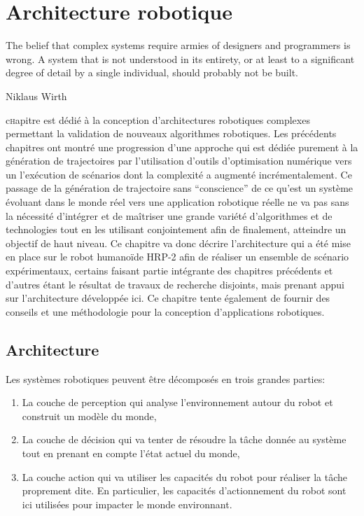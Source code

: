 \chapter{Architecture robotique}
\label{chap:integration}

\epigraph{\foreignlanguage{USenglish}{The belief that complex systems
    require armies of designers and programmers is wrong. A system
    that is not understood in its entirety, or at least to a
    significant degree of detail by a single individual, should
    probably not be built.}}{Niklaus Wirth}
\clearpage

\lettrine[lines=2, lraise=0.1, nindent=0em, slope=-.5em]%
chapitre est dédié à la conception d'architectures robotiques
complexes permettant la validation de nouveaux algorithmes robotiques.
Les précédents chapitres ont montré une progression d'une approche qui
est dédiée purement à la génération de trajectoires par l'utilisation
d'outils d'optimisation numérique vers un l'exécution de scénarios
dont la complexité a augmenté incrémentalement. Ce passage de la
génération de trajectoire sans ``conscience'' de ce qu'est un système
évoluant dans le monde réel vers une application robotique réelle ne
va pas sans la nécessité d'intégrer et de maîtriser une grande variété
d'algorithmes et de technologies tout en les utilisant conjointement
afin de finalement, atteindre un objectif de haut niveau. Ce chapitre
va donc décrire l'architecture qui a été mise en place sur le robot
humanoïde HRP-2 afin de réaliser un ensemble de scénario
expérimentaux, certains faisant partie intégrante des chapitres
précédents et d'autres étant le résultat de travaux de recherche
disjoints, mais prenant appui sur l'architecture développée ici. Ce
chapitre tente également de fournir des conseils et une méthodologie
pour la conception d'applications robotiques.

\section{Architecture}


Les systèmes robotiques peuvent être décomposés en trois grandes
parties:

\begin{enumerate}
\item La couche de perception qui analyse
  l'environnement autour du robot et construit un modèle du monde,
\item La couche de décision qui va tenter de résoudre
  la tâche donnée au système tout en prenant en compte l'état actuel
  du monde,
\item La couche action qui va utiliser les capacités du robot pour
  réaliser la tâche proprement dite. En particulier, les capacités
  d'actionnement du robot sont ici utilisées pour impacter le monde
  environnant.
\end{enumerate}


